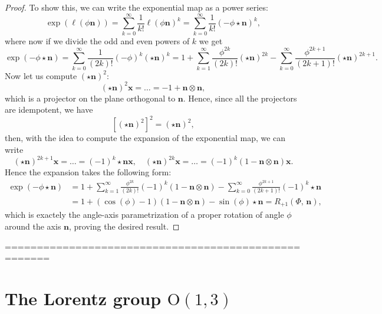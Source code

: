 \begin{proof}
    To show this, we can write the exponential map as a power series:
    \[
        \exp(\ell(\phi\mathbf{n})) = \sum_{k=0}^{\infty} \frac{1}{k!} \ell(\phi\mathbf{n})^k = \sum_{k=0}^{\infty} \frac{1}{k!} (-\phi \star \mathbf{n})^k,
    \]
    where now if we divide the odd and even powers of \(k\) we get
    \[
        \exp(-\phi \star \mathbf{n}) = \sum_{k=0}^{\infty} \frac{1}{(2k)!} (-\phi)^k (\star \mathbf{n})^{k} = 1 + \sum_{k=1}^{\infty} \frac{\phi^{2k}}{(2k)!} (\star \mathbf{n})^{2k} - \sum_{k=0}^{\infty} \frac{\phi^{2k+1}}{(2k+1)!} (\star \mathbf{n})^{2k+1}.
    \]
    Now let us compute \((\star \mathbf{n})^2\):
    \[
        (\star \mathbf{n})^2 \mathbf{x} = \dots = -1 + \mathbf{n} \otimes \mathbf{n},
    \]
    which is a projector on the plane orthogonal to \(\mathbf{n}\). Hence, since all the projectors are idempotent, we have
    \[
        \left[ (\star \mathbf{n})^2 \right]^2 = (\star \mathbf{n})^2,
    \]
    then, with the idea to compute the expansion of the exponential map, we can write
    \[
        (\star \mathbf{n})^{2k + 1}\mathbf{x} = \dots = (-1)^k \star \mathbf{n} \mathbf{x}, \quad (\star \mathbf{n})^{2k}\mathbf{x} = \dots = (-1)^k (1 - \mathbf{n} \otimes \mathbf{n}) \mathbf{x}.
    \]
    Hence the expansion takes the following form:
    \[
        \begin{aligned}
            \exp(-\phi \star \mathbf{n}) & = 1 + \sum_{k=1}^{\infty} \frac{\phi^{2k}}{(2k)!} (-1)^k (1 - \mathbf{n} \otimes \mathbf{n}) - \sum_{k=0}^{\infty} \frac{\phi^{2k+1}}{(2k+1)!} (-1)^k \star \mathbf{n} \\
                                         & = 1 + (\cos(\phi) - 1) (1 - \mathbf{n} \otimes \mathbf{n}) - \sin(\phi) \star \mathbf{n} = R_{+1}(\Phi,\,\mathbf{n}),
        \end{aligned}
    \]
    which is exactely the angle-axis parametrization of a proper rotation of angle \(\phi\) around the axis \(\mathbf{n}\), proving the desired result.
\end{proof}






=====================================================






\section{The Lorentz group \(\mathrm{O}(1,3)\)}

